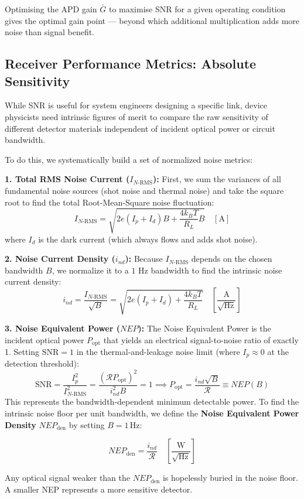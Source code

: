Optimising the APD gain $\bar{G}$ to maximise SNR for a given operating condition gives the optimal gain point — beyond which additional multiplication adds more noise than signal benefit.

\subsection{Receiver Performance Metrics: Absolute Sensitivity}

While SNR is useful for system engineers designing a specific link, device physicists need intrinsic figures of merit to compare the raw sensitivity of different detector materials independent of incident optical power or circuit bandwidth.

To do this, we systematically build a set of normalized noise metrics:

\textbf{1. Total RMS Noise Current ($I_{N\text{-RMS}}$):} First, we sum the variances of all fundamental noise sources (shot noise and thermal noise) and take the square root to find the total Root-Mean-Square noise fluctuation:
\begin{equation*}
    I_{N\text{-RMS}} = \sqrt{2e(I_p + I_d)B + \frac{4k_B T}{R_L}B} \quad [\text{A}]
\end{equation*}
where $I_d$ is the dark current (which always flows and adds shot noise).

\textbf{2. Noise Current Density ($i_{nd}$):} Because $I_{N\text{-RMS}}$ depends on the chosen bandwidth $B$, we normalize it to a $1\text{ Hz}$ bandwidth to find the intrinsic noise current density:
\begin{equation*}
    i_{nd} = \frac{I_{N\text{-RMS}}}{\sqrt{B}} = \sqrt{2e(I_p + I_d) + \frac{4k_B T}{R_L}} \quad \left[\frac{\text{A}}{\sqrt{\text{Hz}}}\right]
\end{equation*}

\textbf{3. Noise Equivalent Power ($NEP$):} The Noise Equivalent Power is the incident optical power $P_\text{opt}$ that yields an electrical signal-to-noise ratio of exactly 1. Setting $\text{SNR} = 1$ in the thermal-and-leakage noise limit (where $I_p \approx 0$ at the detection threshold):
\begin{equation*}
    \text{SNR} = \frac{I_p^2}{I_{N\text{-RMS}}^2} = \frac{(\mathcal{R} P_\text{opt})^2}{i_{nd}^2 B} = 1 \implies P_\text{opt} = \frac{i_{nd}\sqrt{B}}{\mathcal{R}} \equiv NEP(B)
\end{equation*}
This represents the bandwidth-dependent minimum detectable power. To find the intrinsic noise floor per unit bandwidth, we define the \textbf{Noise Equivalent Power Density} $NEP_{\text{den}}$ by setting $B = 1\,\text{Hz}$:
\begin{keyresult}
    \begin{equation}
        NEP_{\text{den}} = \frac{i_{nd}}{\mathcal{R}} \quad \left[\frac{\text{W}}{\sqrt{\text{Hz}}}\right]
    \end{equation}
\end{keyresult}
Any optical signal weaker than the $NEP_{\text{den}}$ is hopelessly buried in the noise floor. A smaller NEP represents a more sensitive detector.

